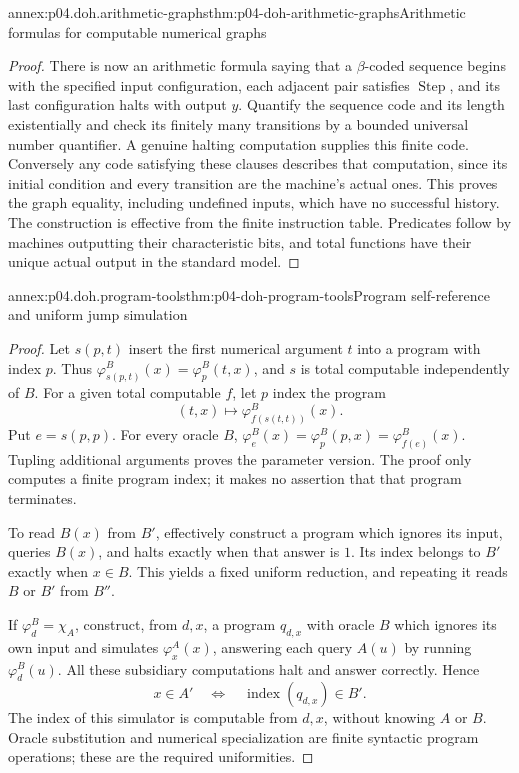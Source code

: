 \begin{annexitem}{annex:p04.doh.arithmetic-graphs}{thm:p04-doh-arithmetic-graphs}{Arithmetic formulas for computable numerical graphs}
\begin{proof}
There is now an arithmetic formula saying that a \(\beta\)-coded
sequence begins with the specified input configuration, each adjacent
pair satisfies \(\operatorname{Step}\), and its last configuration
halts with output \(y\). Quantify the sequence code and its length
existentially and check its finitely many transitions by a bounded
universal number quantifier. A genuine halting computation supplies
this finite code. Conversely any code satisfying these clauses describes
that computation, since its initial condition and every transition are
the machine's actual ones. This proves the graph equality, including
undefined inputs, which have no successful history. The construction
is effective from the finite instruction table. Predicates follow by
machines outputting their characteristic bits, and total functions have
their unique actual output in the standard model.
\end{proof}
\end{annexitem}

\begin{annexitem}{annex:p04.doh.program-tools}{thm:p04-doh-program-tools}{Program self-reference and uniform jump simulation}
\begin{proof}
Let \(s(p,t)\) insert the first numerical argument \(t\) into a program
with index \(p\). Thus
\(\varphi_{s(p,t)}^B(x)=\varphi_p^B(t,x)\), and \(s\) is total
computable independently of \(B\). For a given total computable \(f\),
let \(p\) index the program
\[
 (t,x)\longmapsto\varphi_{f(s(t,t))}^B(x).
\]
Put \(e=s(p,p)\). For every oracle \(B\),
\(\varphi_e^B(x)=\varphi_p^B(p,x)=\varphi_{f(e)}^B(x)\).
Tupling additional arguments proves the parameter version. The proof only
computes a finite program index; it makes no assertion that that program
terminates.

To read \(B(x)\) from \(B'\), effectively construct a program which
ignores its input, queries \(B(x)\), and halts exactly when that answer
is \(1\). Its index belongs to \(B'\) exactly when \(x\in B\).
This yields a fixed uniform reduction, and repeating it reads \(B\)
or \(B'\) from \(B''\).

If \(\varphi_d^B=\chi_A\), construct, from \(d,x\), a program
\(q_{d,x}\) with oracle \(B\) which ignores its own input and
simulates \(\varphi_x^A(x)\), answering each query \(A(u)\) by
running \(\varphi_d^B(u)\). All these subsidiary computations halt
and answer correctly. Hence
\[
 x\in A'\quad\Longleftrightarrow\quad
 \operatorname{index}(q_{d,x})\in B'.
\]
The index of this simulator is computable from \(d,x\), without knowing
\(A\) or \(B\). Oracle substitution and numerical specialization
are finite syntactic program operations; these are the required uniformities.
\end{proof}
\end{annexitem}

